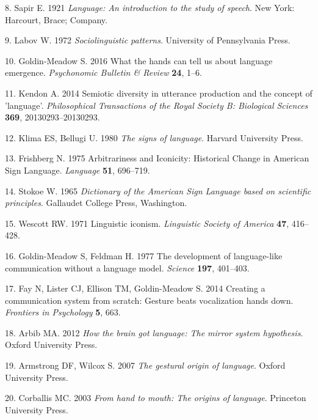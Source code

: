 \documentclass[english,floatsintext,man]{apa6}
\theoremstyle{definition}
\theoremstyle{definition}
\theoremstyle{definition}
\theoremstyle{remark}
\begin{document}
\leavevmode\hypertarget{ref-Sapir:1921}{}%
8. Sapir E. 1921 \emph{Language: An introduction to the study of
speech}. New York: Harcourt, Brace; Company.

\leavevmode\hypertarget{ref-Labov:1972}{}%
9. Labov W. 1972 \emph{Sociolinguistic patterns}. University of
Pennsylvania Press.

\leavevmode\hypertarget{ref-GoldinMeadow:2016bw}{}%
10. Goldin-Meadow S. 2016 What the hands can tell us about language
emergence. \emph{Psychonomic Bulletin \& Review} \textbf{24}, 1--6.

\leavevmode\hypertarget{ref-Kendon:2014eg}{}%
11. Kendon A. 2014 Semiotic diversity in utterance production and the
concept of 'language'. \emph{Philosophical Transactions of the Royal
Society B: Biological Sciences} \textbf{369}, 20130293--20130293.

\leavevmode\hypertarget{ref-Klima:1980si}{}%
12. Klima ES, Bellugi U. 1980 \emph{The signs of language}. Harvard
University Press.

\leavevmode\hypertarget{ref-Frishberg:1975dh}{}%
13. Frishberg N. 1975 Arbitrariness and Iconicity: Historical Change in
American Sign Language. \emph{Language} \textbf{51}, 696--719.

\leavevmode\hypertarget{ref-Stokoe:1965}{}%
14. Stokoe W. 1965 \emph{Dictionary of the American Sign Language based
on scientific principles}. Gallaudet College Press, Washington.

\leavevmode\hypertarget{ref-Wescott:1971to}{}%
15. Wescott RW. 1971 Linguistic iconism. \emph{Linguistic Society of
America} \textbf{47}, 416--428.

\leavevmode\hypertarget{ref-GoldinMeadow:1977gz}{}%
16. Goldin-Meadow S, Feldman H. 1977 The development of language-like
communication without a language model. \emph{Science} \textbf{197},
401--403.

\leavevmode\hypertarget{ref-Fay:2014cw}{}%
17. Fay N, Lister CJ, Ellison TM, Goldin-Meadow S. 2014 Creating a
communication system from scratch: Gesture beats vocalization hands
down. \emph{Frontiers in Psychology} \textbf{5}, 663.

\leavevmode\hypertarget{ref-Arbib:2012htb}{}%
18. Arbib MA. 2012 \emph{How the brain got language: The mirror system
hypothesis}. Oxford University Press.

\leavevmode\hypertarget{ref-Armstrong:2007go}{}%
19. Armstrong DF, Wilcox S. 2007 \emph{The gestural origin of language}.
Oxford University Press.

\leavevmode\hypertarget{ref-Corballis:2003ha}{}%
20. Corballis MC. 2003 \emph{From hand to mouth: The origins of
language}. Princeton University Press.
\end{document}
